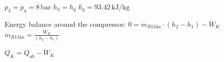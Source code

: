 \( p_3 = p_4 = 8 \, \text{bar} \)  
\( h_4 = h_q \)  
\( h_q = 93.42 \, \text{kJ/kg} \)  

Energy balance around the compressor:  
\( 0 = \dot{m}_{R134a} \cdot (h_2 - h_1) - \dot{W}_K \)  
\( \dot{m}_{R134a} = \frac{\dot{W}_K}{(h_2 - h_1)} \)  

\( \dot{Q}_K = \dot{Q}_{ab} - \dot{W}_K \)